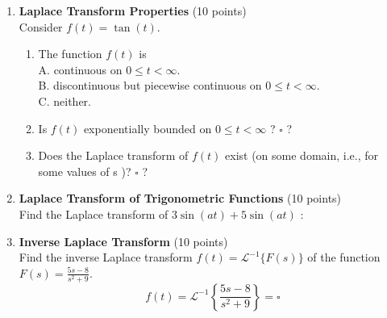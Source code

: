 \begin{enumerate}
  \item \textbf{Laplace Transform Properties} (10 points)\\
  Consider $f(t)=\tan (t)$.
  \begin{enumerate}[label=\alph*]
    \item The function $f(t)$ is\\
    A. continuous on $0 \leq t<\infty$.\\
    B. discontinuous but piecewise continuous on $0 \leq t<\infty$.\\
    C. neither.\\
    \begin{subanswer}
    \end{subanswer}
    \item Is $f(t)$ exponentially bounded on $0 \leq t<\infty$ ? $\square$ ?\\
    \begin{subanswer}
    \end{subanswer}
    \item Does the Laplace transform of $f(t)$ exist (on some domain, i.e., for some values of s )? $\square$ ?\\
    \begin{subanswer}
    \end{subanswer}
  \end{enumerate}

  \item \textbf{Laplace Transform of Trigonometric Functions} (10 points)\\
  Find the Laplace transform of $3 \sin (a t)+5 \sin (a t)$ :\\
  \begin{subanswer}
  \end{subanswer}

  \newpage

  \item \textbf{Inverse Laplace Transform} (10 points)\\
  Find the inverse Laplace transform $f(t)=\mathcal{L}^{-1}\{F(s)\}$ of the function $F(s)=\frac{5 s-8}{s^2+9}$.
  $$
  f(t)=\mathcal{L}^{-1}\left\{\frac{5 s-8}{s^2+9}\right\}=\square
  $$
  \begin{subanswer}
  \end{subanswer}


\end{enumerate}
